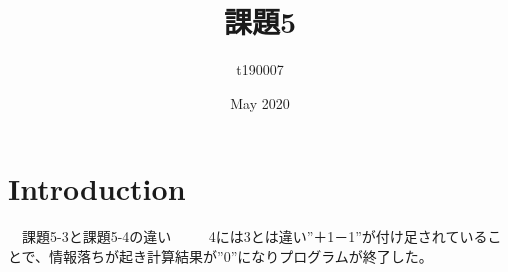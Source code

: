 \title{課題5}
\author{t190007 }
\date{May 2020}



\maketitle

\section{Introduction}
　課題5-3と課題5-4の違い
　
　4には3とは違い”＋1－1”が付け足されていることで、情報落ちが起き計算結果が”0”になりプログラムが終了した。

